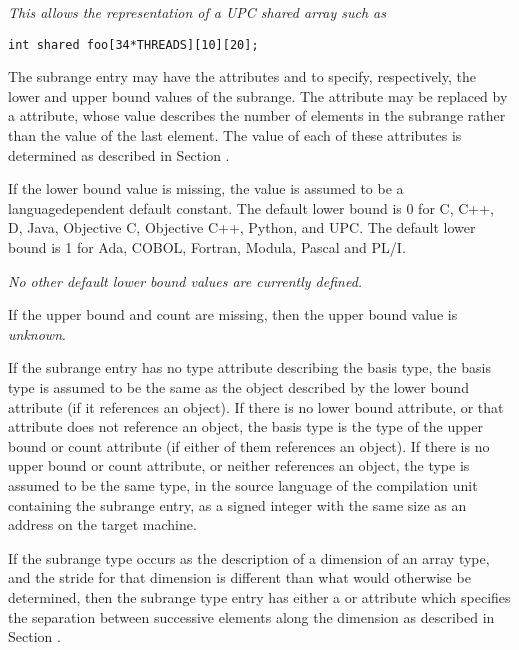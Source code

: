 \textit{This allows the representation of a UPC shared array such as}

\begin{lstlisting}
int shared foo[34*THREADS][10][20];
\end{lstlisting}

The subrange entry may have the attributes 
and  to specify, respectively, the lower
and upper bound values of the subrange. The 
attribute may be replaced by a  attribute, whose
value describes the number of elements in the subrange rather
than the value of the last element. The value of each of
these attributes is determined as described in 
Section .

If the lower bound value is missing, the value is assumed to
be a language\dash dependent default constant. The default lower
bound is 0 for C, C++, D, Java, Objective C, Objective C++,
Python, and UPC. The default lower bound is 1 for Ada, COBOL,
Fortran, Modula, Pascal and PL/I.

\textit{No other default lower bound values are currently defined.}

If the upper bound and count are missing, then the upper bound value is 
\textit{unknown}.

If the subrange entry has no type attribute describing the
basis type, the basis type is assumed to be the same as
the object described by the lower bound attribute (if it
references an object). If there is no lower bound attribute,
or that attribute does not reference an object, the basis type
is the type of the upper bound or count attribute (if either
of them references an object). If there is no upper bound or
count attribute, or neither references an object, the type is
assumed to be the same type, in the source language of the
compilation unit containing the subrange entry, as a signed
integer with the same size as an address on the target machine.

If the subrange type occurs as the description of a dimension
of an array type, and the stride for that dimension is
different than what would otherwise be determined, then
the subrange type entry has either a  or
 attribute which specifies the separation
between successive elements along the dimension as described
in 
Section .

